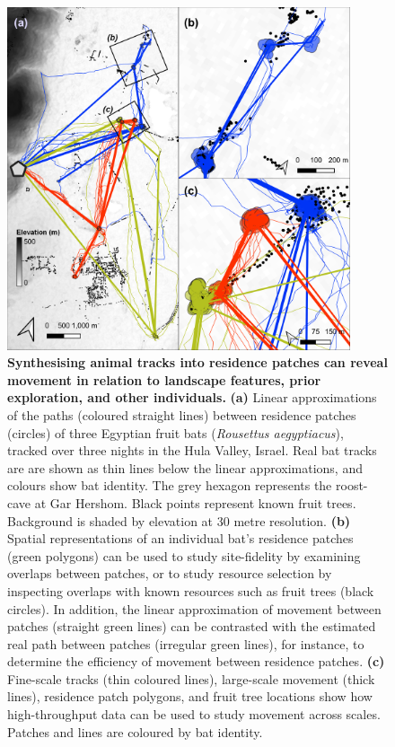 \begin{figure}[ht!]
    \centering
    \includegraphics[width=0.9\textwidth]{figures/preprocessing/fig_08.png}
    \caption{
        \textbf{Synthesising animal tracks into residence patches can reveal movement in relation to landscape features, prior exploration, and other individuals.}
        \textbf{(a)} Linear approximations of the paths (coloured straight lines) between residence patches (circles) of three Egyptian fruit bats (\textit{Rousettus aegyptiacus}), tracked over three nights in the Hula Valley, Israel.
        Real bat tracks are are shown as thin lines below the linear approximations, and colours show bat identity. The grey hexagon represents the roost-cave at Gar Hershom.
        Black points represent known fruit trees.
        Background is shaded by elevation at 30 metre resolution.
        \textbf{(b)} Spatial representations of an individual bat's residence patches (green polygons) can be used to study site-fidelity by examining overlaps between patches, or to study resource selection by inspecting overlaps with known resources such as fruit trees (black circles).
        In addition, the linear approximation of movement between patches (straight green lines) can be contrasted with the estimated real path between patches (irregular green lines), for instance, to determine the efficiency of movement between residence patches.
        \textbf{(c)} Fine-scale tracks (thin coloured lines), large-scale movement (thick lines), residence patch polygons, and fruit tree locations show how high-throughput data can be used to study movement across scales.
        Patches and lines are coloured by bat identity.
    }
    \label{preproc_fig_08}
\end{figure}

